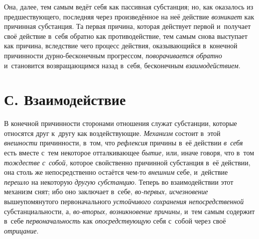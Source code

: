Она, далее, тем самым ведёт себя как пассивная субстанция; но, как оказалось
из предшествующего, последняя через произведённое на неё действие
{\em возникает} как причинная субстанция. Та первая
причина, которая действует первой и~получает своё действие в~себя обратно
как противодействие, тем самым снова выступает как причина, вследствие чего
процесс действия, оказывающийся в~конечной причинности дурно-бесконечным
прогрессом, {\em поворачивается обратно} и~становится
возвращающимся назад в~себя, бесконечным {\em взаимодействием}.


\section[С. Взаимодействие]{С. Взаимодействие}

В конечной причинности сторонами отношения
служат субстанции, которые относятся друг к~другу как воздействующие.
{\em Механизм} состоит в~этой {\em внешности} причинности, в~том, что
{\em рефлексия} причины в~её действии
{\em в~себя} есть вместе с~тем некоторое отталкивающее
{\em бытие,} или, иначе говоря, что в~том
{\em тождестве с~собой,} которое свойственно причинной
субстанция в~её действии, она столь же непосредственно остаётся чем-то
{\em внешним} себе, и~действие {\em перешло} на некоторую
{\em другую субстанцию}. Теперь во взаимодействии этот
механизм снят; ибо оно заключает в~себе, {\em во-первых, исчезновение}
вышеупомянутого первоначального {\em устойчивого
сохранения непосредственной} субстанциальности, а,
{\em во-вторых, возникновение причины,} и~тем самым содержит в~себе
{\em первоначальность} как {\em опосредствующую} себя с~собой через своё
{\em отрицание}.

